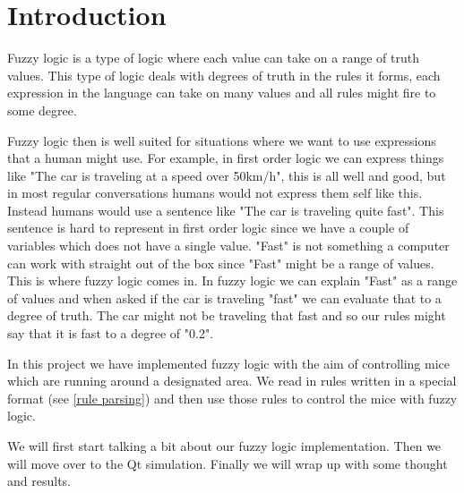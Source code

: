 \section{Introduction}\label{intro}
Fuzzy logic is a type of logic where each value can take on a range of truth values.
This type of logic deals with degrees of truth in the rules it forms, each expression
in the language can take on many values and all rules might fire to some degree.

Fuzzy logic then is well suited for situations where we want to use expressions that
a human might use. For example, in first order logic we can express things like "The
car is traveling at a speed over 50km/h", this is all well and good, but in most regular
conversations humans would not express them self like this. Instead humans would use
a sentence like "The car is traveling quite fast". This sentence is hard to represent
in first order logic since we have a couple of variables which does not have a single 
value. "Fast" is not something a computer can work with straight out of the box since 
"Fast" might be a range of values. This is where fuzzy logic comes in. In fuzzy logic
we can explain "Fast" as a range of values and when asked if the car is traveling "fast"
we can evaluate that to a degree of truth. The car might not be traveling that fast and
so our rules might say that it is fast to a degree of "0.2".

In this project we have implemented fuzzy logic with the aim of controlling mice which
are running around a designated area. We read in rules written in a special format (see
\ref{rule parsing}) and then use those rules to control the mice with fuzzy logic.

We will first start talking a bit about our fuzzy logic implementation. Then we will move
over to the Qt simulation. Finally we will wrap up with some thought and results.
